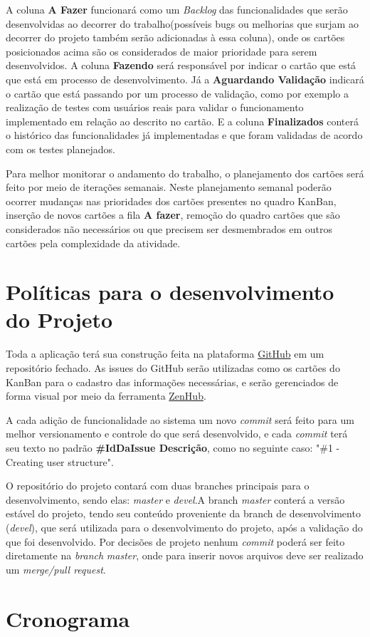 A coluna \textbf{A Fazer} funcionará como um \textit{Backlog} das funcionalidades que serão desenvolvidas ao decorrer do trabalho(possíveis bugs ou melhorias que surjam ao decorrer do projeto também serão adicionadas à essa coluna), onde os cartões posicionados acima são os considerados de maior prioridade para serem desenvolvidos. A coluna \textbf{Fazendo} será responsável por indicar o cartão que está que está em processo de desenvolvimento. Já a \textbf{Aguardando Validação} indicará o cartão que está passando por um processo de validação, como por exemplo a realização de testes com usuários reais para validar o funcionamento implementado em relação ao descrito no cartão. E a coluna \textbf{Finalizados} conterá o histórico das funcionalidades já implementadas e que foram validadas de acordo com os testes planejados.

Para melhor monitorar o andamento do trabalho, o planejamento dos cartões será feito por meio de iterações semanais. Neste planejamento semanal poderão ocorrer mudanças nas prioridades dos cartões presentes no quadro KanBan, inserção de novos cartões a fila \textbf{A fazer}, remoção do quadro cartões que são considerados não necessários ou que precisem ser desmembrados em outros cartões pela complexidade da atividade. 

\section{Políticas para o desenvolvimento do Projeto}

Toda a aplicação terá sua construção feita na plataforma \href{https://github.com/}{GitHub}
em um repositório fechado. As issues do GitHub serão utilizadas como os cartões do KanBan para o cadastro das informações necessárias, e serão gerenciados de forma visual por meio da ferramenta \href{https://www.zenhub.com/}{ZenHub}.
 
A cada adição de funcionalidade ao sistema um novo \textit{commit} será feito para um melhor versionamento e controle do que será desenvolvido, e cada \textit{commit} terá seu texto no padrão \textbf{\#IdDaIssue Descrição}, como no seguinte caso:  "\#1 - Creating user structure".

O repositório do projeto contará com duas branches principais para o desenvolvimento, sendo elas: \textit{master} e \textit{devel}.A branch \textit{master} conterá a versão estável do projeto, tendo seu conteúdo proveniente da branch de desenvolvimento (\textit{devel}), que será utilizada para o desenvolvimento do projeto, após a validação do que foi desenvolvido. Por decisões de projeto nenhum \textit{commit} poderá ser feito diretamente na \textit{branch} \textit{master}, onde para inserir novos arquivos deve ser realizado um \textit{merge/pull request}.



\section{Cronograma}

